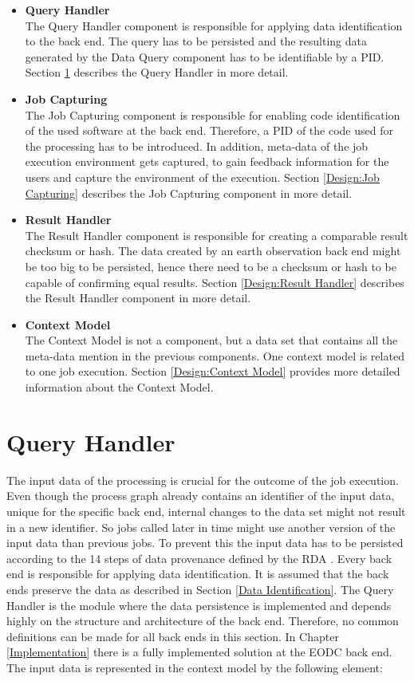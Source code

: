 \documentclass[draft,final]{vutinfth} %
\begin{document}
 \begin{itemize}
	\item \textbf{Query Handler} \\
	The Query Handler component is responsible for applying data identification to the back end. The query has to be persisted and the resulting data generated by the Data Query component has to be identifiable by a PID. Section \ref{Design:Data Identification} describes the Query Handler in more detail.     
	\item \textbf{Job Capturing} \\ 
	The Job Capturing component is responsible for enabling code identification of the used software at the back end. Therefore, a PID of the code used for the processing has to be introduced. In addition, meta-data of the job execution environment gets captured, to gain feedback information for the users and capture the environment of the execution. Section \ref{Design:Job Capturing} describes the Job Capturing component in more detail.
	\item \textbf{Result Handler} \\
	The Result Handler component is responsible for creating a comparable result checksum or hash. The data created by an earth observation back end might be too big to be persisted, hence there need to be a checksum or hash to be capable of confirming equal results. Section \ref{Design:Result Handler} describes the Result Handler component in more detail.   
	\item \textbf{Context Model} \\ 
	The Context Model is not a component, but a data set that contains all the meta-data mention in the previous components. One context model is related to one job execution. Section \ref{Design:Context Model} provides more detailed information about the Context Model. 
\end{itemize}

\section{Query Handler}\label{Design:Data Identification}
The input data of the processing is crucial for the outcome of the job execution. Even though the process graph already contains an identifier of the input data, unique for the specific back end, internal changes to the data set might not result in a new identifier. So jobs called later in time might use another version of the input data than previous jobs. To prevent this the input data has to be persisted according to the 14 steps of data provenance defined by the RDA \cite{rauber2016identification}. Every back end is responsible for applying data identification. It is assumed that the back ends preserve the data as described in Section \ref{Data Identification}. The Query Handler is the module where the data persistence is implemented and depends highly on the structure and architecture of the back end. Therefore, no common definitions can be made for all back ends in this section. In Chapter \ref{Implementation} there is a fully implemented solution at the EODC back end. The input data is represented in the context model by the following element: 
\end{document}
